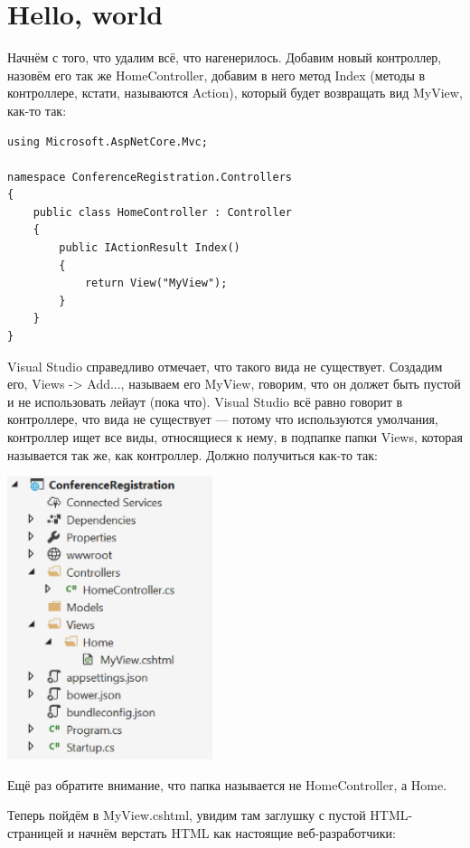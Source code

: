 \documentclass[a5paper]{article}
\begin{document}
\section{Hello, world}

Начнём с того, что удалим всё, что нагенерилось. Добавим новый контроллер, назовём его так же HomeController, добавим в него метод Index (методы в контроллере, кстати, называются Action), который будет возвращать вид MyView, как-то так:

\begin{verbatim}
using Microsoft.AspNetCore.Mvc;

namespace ConferenceRegistration.Controllers
{
    public class HomeController : Controller
    {
        public IActionResult Index()
        {
            return View("MyView");
        }
    }
}
\end{verbatim}

Visual Studio справедливо отмечает, что такого вида не существует. Создадим его, Views -> Add..., называем его MyView, говорим, что он должет быть пустой и не использовать лейаут (пока что). Visual Studio всё равно говорит в контроллере, что вида не существует ---
потому что используются умолчания, контроллер ищет все виды, относящиеся к нему, в подпапке папки Views, которая называется так же, как контроллер. Должно получиться как-то так:

\begin{center}
	\includegraphics[width=0.45\textwidth]{projectStructure.png}
\end{center}

Ещё раз обратите внимание, что папка называется не HomeController, а Home.

Теперь пойдём в MyView.cshtml, увидим там заглушку с пустой HTML-страницей и начнём верстать HTML как настоящие веб-разработчики:
\end{document}

